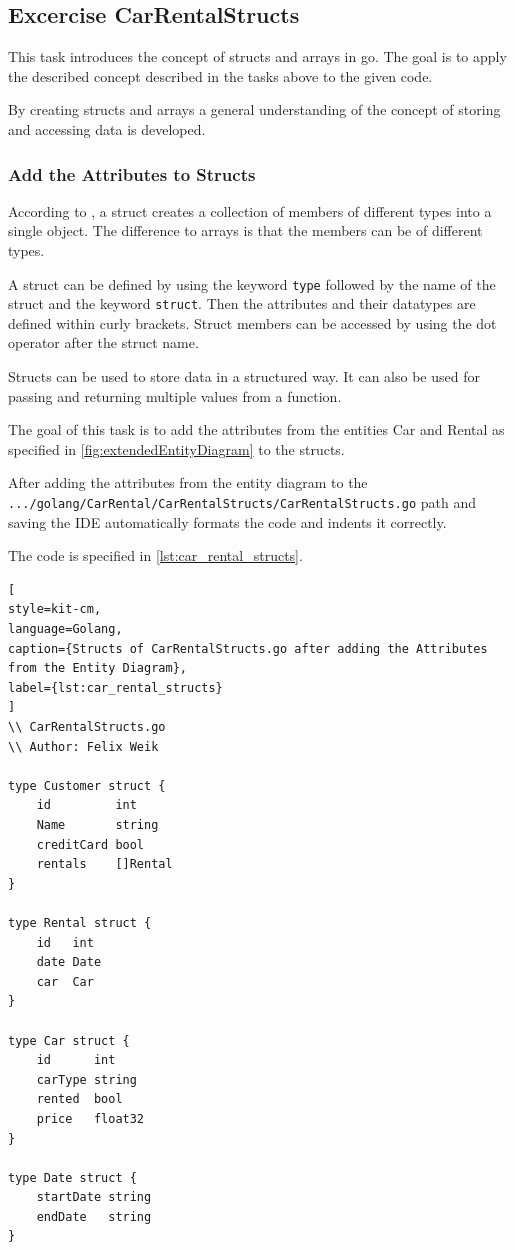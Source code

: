 \subsection{Excercise CarRentalStructs}
\label{sec:car_rental_structs}
This task introduces the concept of structs and arrays in go.
The goal is to apply the described concept described in the tasks above to the given code.

By creating structs and arrays a general understanding of the concept of storing and accessing data is developed.

\subsubsection*{Add the Attributes to Structs}
According to \cite{W3-GOSTRUCT}, a struct creates a collection of members of different types into a single object.
The difference to arrays is that the members can be of different types.

A struct can be defined by using the keyword \texttt{type} followed by the name of the struct and the keyword \texttt{struct}.
Then the attributes and their datatypes are defined within curly brackets.
Struct members can be accessed by using the dot operator after the struct name.

Structs can be used to store data in a structured way.
It can also be used for passing and returning multiple values from a function.

The goal of this task is to add the attributes from the entities Car and Rental as specified in \autoref{fig:extendedEntityDiagram} to the structs.

After adding the attributes from the entity diagram to the \hfill \newline \texttt{.../golang/CarRental/CarRentalStructs/CarRentalStructs.go} path and saving
the IDE automatically formats the code and indents it correctly.

The code is specified in \autoref{lst:car_rental_structs}.
\begin{lstlisting}[
style=kit-cm,
language=Golang,
caption={Structs of CarRentalStructs.go after adding the Attributes from the Entity Diagram},
label={lst:car_rental_structs}
]
\\ CarRentalStructs.go
\\ Author: Felix Weik

type Customer struct {
	id         int
	Name       string
	creditCard bool
	rentals    []Rental
}

type Rental struct {
	id   int
	date Date
	car  Car
}

type Car struct {
	id      int
	carType string
	rented  bool
	price   float32
}

type Date struct {
	startDate string
	endDate   string
}
\end{lstlisting}

